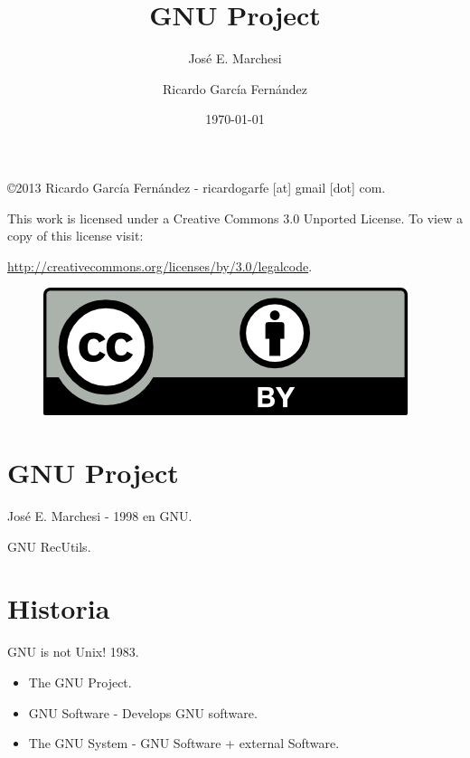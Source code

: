 \documentclass[11pt]{scrartcl}
\title{\textbf{GNU Project}}
\subtitle{Jos\'e E. Marchesi}
\author{Ricardo Garc\'ia Fern\'andez}
\date{\today}
\begin{document}
\maketitle

\vfill

\begin{flushright}
    \copyright  2013 Ricardo Garc\'ia Fern\'andez - ricardogarfe [at] gmail [dot] com.

    This work is licensed under a Creative Commons 3.0 Unported License.
    To view a copy of this license visit:
 
    \url{http://creativecommons.org/licenses/by/3.0/legalcode}.
\end{flushright}

\begin{figure}[h]
    \begin{flushright}	
        \includegraphics{by}
        \label{fig:by}
    \end{flushright}
\end{figure}

\newpage

\section{GNU Project}
\label{sec:gnu-project}

Jos\'e E. Marchesi - 1998 en GNU.

GNU RecUtils.


\section{Historia}
\label{sec:historia}

\par GNU is not Unix! 1983.

\begin{itemize}
	\item The GNU Project.
	\item GNU Software - Develops GNU software.
	\item The GNU System - GNU Software + external Software.
\end{itemize}
\end{document}
